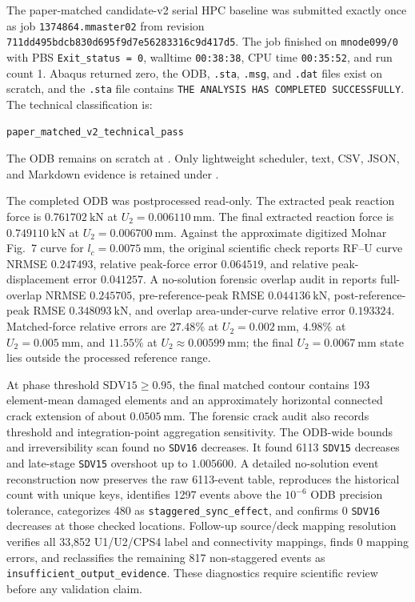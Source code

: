\documentclass[11pt,a4paper]{article}
\begin{document}
The paper-matched candidate-v2 serial HPC baseline was submitted exactly once as job \texttt{1374864.mmaster02} from revision \texttt{711dd495bdcb830d695f9d7e56283316c9d417d5}. The job finished on \texttt{mnode099/0} with PBS \texttt{Exit\_status = 0}, walltime \texttt{00:38:38}, CPU time \texttt{00:35:52}, and run count 1. Abaqus returned zero, the ODB, \texttt{.sta}, \texttt{.msg}, and \texttt{.dat} files exist on scratch, and the \texttt{.sta} file contains \texttt{THE ANALYSIS HAS COMPLETED SUCCESSFULLY}. The technical classification is:

\begin{center}
\texttt{paper\_matched\_v2\_technical\_pass}
\end{center}

The ODB remains on scratch at . Only lightweight scheduler, text, CSV, JSON, and Markdown evidence is retained under .

The completed ODB was postprocessed read-only. The extracted peak reaction force is \(0.761702\ \mathrm{kN}\) at \(U_2=0.006110\ \mathrm{mm}\). The final extracted reaction force is \(0.749110\ \mathrm{kN}\) at \(U_2=0.006700\ \mathrm{mm}\). Against the approximate digitized Molnar Fig.~7 curve for \(l_c=0.0075\ \mathrm{mm}\), the original scientific check reports RF--U curve NRMSE \(0.247493\), relative peak-force error \(0.064519\), and relative peak-displacement error \(0.041257\). A no-solution forensic overlap audit in  reports full-overlap NRMSE \(0.245705\), pre-reference-peak RMSE \(0.044136\ \mathrm{kN}\), post-reference-peak RMSE \(0.348093\ \mathrm{kN}\), and overlap area-under-curve relative error \(0.193324\). Matched-force relative errors are \(27.48\%\) at \(U_2=0.002\ \mathrm{mm}\), \(4.98\%\) at \(U_2=0.005\ \mathrm{mm}\), and \(11.55\%\) at \(U_2\approx0.00599\ \mathrm{mm}\); the final \(U_2=0.0067\ \mathrm{mm}\) state lies outside the processed reference range.

At phase threshold \(\mathrm{SDV15}\ge0.95\), the final matched contour contains 193 element-mean damaged elements and an approximately horizontal connected crack extension of about \(0.0505\ \mathrm{mm}\). The forensic crack audit also records threshold and integration-point aggregation sensitivity. The ODB-wide bounds and irreversibility scan found no \texttt{SDV16} decreases. It found 6113 \texttt{SDV15} decreases and late-stage \texttt{SDV15} overshoot up to \(1.005600\). A detailed no-solution event reconstruction now preserves the raw 6113-event table, reproduces the historical count with unique keys, identifies 1297 events above the \(10^{-6}\) ODB precision tolerance, categorizes 480 as \texttt{staggered\_sync\_effect}, and confirms 0 \texttt{SDV16} decreases at those checked locations. Follow-up source/deck mapping resolution verifies all 33,852 U1/U2/CPS4 label and connectivity mappings, finds 0 mapping errors, and reclassifies the remaining 817 non-staggered events as \texttt{insufficient\_output\_evidence}. These diagnostics require scientific review before any validation claim.
\end{document}
